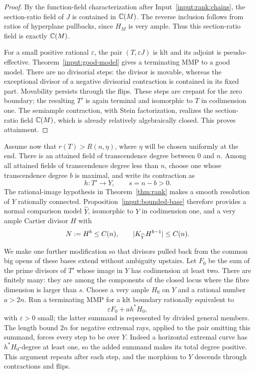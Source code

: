 \begin{proof}
By the function-field characterization after
Input~\ref{input:rank:chains}, the section-ratio field of $J$ is contained
in $\mathbb C(M)$.  The reverse inclusion follows from ratios of hyperplane
pullbacks, since $H_M$ is very ample.  Thus this section-ratio field is
exactly $\mathbb C(M)$.

For a small positive rational $\varepsilon$, the pair
$(T,\varepsilon J)$ is klt and its adjoint is pseudo-effective.  Theorem~\ref{input:good-model} gives a terminating MMP to a good model.  There
are no divisorial steps: the divisor is movable, whereas the exceptional
divisor of a negative divisorial contraction is contained in its fixed
part.  Movability persists through the flips.  These steps are crepant
for the zero boundary; the resulting $T'$ is again terminal and
isomorphic to $T$ in codimension one.  The semiample contraction, with
Stein factorization, realizes the section-ratio field $\mathbb C(M)$, which is
already relatively algebraically closed.  This proves attainment.
\end{proof}

Assume now that $r(T)>R(n,\eta)$, where $\eta$ will be chosen uniformly
at the end.  There is an attained field of transcendence degree between
$0$ and $n$.  Among all attained fields of transcendence degree less
than $n$, choose one whose transcendence degree $b$ is maximal, and
write its contraction as
\[
                    h:T'\longrightarrow Y,
                    \qquad s=n-b>0.
\]
The rational-image hypothesis in Theorem~\ref{thm:rank} makes a smooth
resolution of $Y$ rationally connected.  Proposition~\ref{input:bounded-base}
therefore provides a normal comparison model $\widehat Y$, isomorphic
to $Y$ in codimension one, and a very ample Cartier divisor $H$ with
\begin{equation}\label{eq:rank:base-degree}
          N:=H^b\le C(n),
          \qquad \lvert K_{\widehat Y}H^{b-1}\rvert\le C(n).
\end{equation}

We make one further modification so that divisors pulled back from the
common big opens of these bases extend without ambiguity upstairs.
Let $F_0$ be the sum of the prime divisors of $T'$ whose image in $Y$
has codimension at least two.  There are finitely many: they are among
the components of the closed locus where the fibre dimension is larger
than $s$.  Choose a very ample $H_0$ on $Y$ and a rational number
$a>2n$.  Run a terminating MMP for a klt boundary rationally equivalent
to
\[
                        \varepsilon F_0+a h^*H_0,
\]
with $\varepsilon>0$ small; the latter summand is represented by divided
general members.  The length bound $2n$ for negative extremal rays,
applied to the pair omitting this summand, forces every step to be over
$Y$.  Indeed a horizontal extremal curve has $h^*H_0$-degree at least
one, so the added summand makes its total degree positive.  This
argument repeats after each step, and the morphism to $Y$ descends
through contractions and flips.

